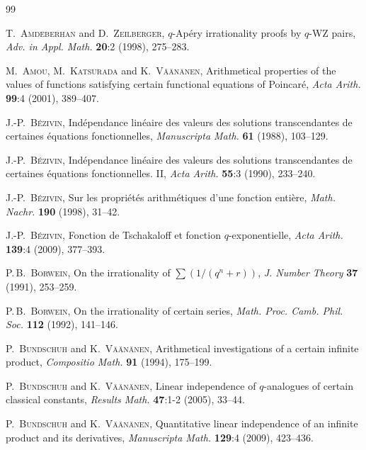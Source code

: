 \documentclass[12pt,reqno]{amsart}
\theoremstyle{remark}
\begin{document}
\begin{thebibliography}{99}

\textsc{T.~Amdeberhan} and \textsc{D.~Zeilberger},
$q$-Ap\'ery irrationality proofs by $q$-WZ pairs,
\emph{Adv. in Appl. Math.} \textbf{20}:2 (1998), 275--283.

\textsc{M.~Amou}, \textsc{M.~Katsurada} and \textsc{K.~V\"a\"an\"anen},
Arithmetical properties of the values of functions satisfying certain functional equations of Poincar\'e,
\emph{Acta Arith.} \textbf{99}:4 (2001), 389--407.

\textsc{J.-P.~B\'ezivin},
Ind\'ependance lin\'eaire des valeurs des solutions transcendantes de certaines \'equations fonctionnelles,
\emph{Manuscripta Math.} \textbf{61} (1988), 103--129.

\textsc{J.-P.~B\'ezivin},
Ind\'ependance lin\'eaire des valeurs des solutions transcendantes de certaines \'equations fonctionnelles. II,
\emph{Acta Arith.} \textbf{55}:3 (1990), 233--240.

\textsc{J.-P.~B\'ezivin},
Sur les propri\'et\'es arithm\'etiques d'une fonction enti\`ere,
\emph{Math. Nachr.} \textbf{190} (1998), 31--42.

\textsc{J.-P.~B\'ezivin},
Fonction de Tschakaloff et fonction $q$-exponentielle,
\emph{Acta Arith.} \textbf{139}:4 (2009), 377--393.

\textsc{P.\,B.~Borwein},
On the irrationality of $\sum(1/(q^n+r))$,
\emph{J. Number Theory} \textbf{37} (1991), 253--259.

\textsc{P.\,B.~Borwein},
On the irrationality of certain series,
\emph{Math. Proc. Camb. Phil. Soc.} \textbf{112} (1992), 141--146.

\textsc{P.~Bundschuh} and \textsc{K.~V\"a\"an\"anen},
Arithmetical investigations of a certain infinite product,
\emph{Compositio Math.} \textbf{91} (1994), 175--199.

\textsc{P.~Bundschuh} and \textsc{K.~V\"a\"an\"anen},
Linear independence of $q$-analogues of certain classical constants,
\emph{Results Math.} \textbf{47}:1-2 (2005), 33--44.

\textsc{P.~Bundschuh} and \textsc{K.~V\"a\"an\"anen},
Quantitative linear independence of an infinite product and its derivatives,
\emph{Manuscripta Math.} \textbf{129}:4 (2009), 423--436.


\end{thebibliography}
\end{document}
